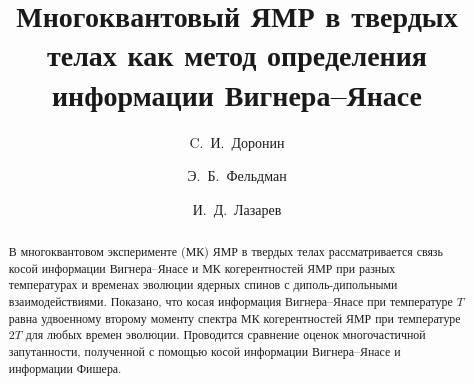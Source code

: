 \documentclass[preprint,12pt]{elsarticle}
\begin{document}
\begin{frontmatter}



\title{Многоквантовый ЯМР в твердых телах как метод определения информации Вигнера--Янасе}





\author[icp]{C.~И.~Доронин}
\author[icp]{Э.~Б.~Фельдман}
\author[icp,msu]{И.~Д.~Лазарев}
\address[icp]{Институт проблем химической физики Российской Академии Наук, \\ Черноголовка, Москва, Россия 142432} 
\address[msu]{Факультет фундаментальной физико-химической инженерии. МГУ им. Ломоносова, GSP-1, Москва. Россия 119991}

\begin{abstract}
В многоквантовом эксперименте  (МК) ЯМР в твердых телах рассматривается связь косой информации Вигнера--Янасе и  МК когерентностей ЯМР при разных температурах и временах эволюции ядерных спинов с диполь-дипольными взаимодействиями.
Показано, что косая информация Вигнера--Янасе при температуре $T$ равна удвоенному второму моменту  спектра МК когерентностей ЯМР  при температуре $2T$ для любых времен эволюции.
Проводится сравнение оценок многочастичной запутанности, полученной с помощью косой информации Вигнера--Янасе и информации Фишера.
\end{abstract}


\end{frontmatter}
\end{document}
